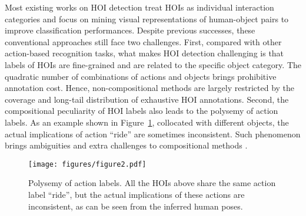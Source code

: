 \documentclass[sigconf,screen]{acmart}
\begin{document}
Most existing works on HOI detection \cite{gkioxari2018detecting,shen2018scaling,gao2018ican,li2019transferable,wang2019deep,wan2019pose,gupta2019no} treat HOIs as individual interaction categories and focus on mining visual representations of human-object pairs to improve classification performances. Despite previous successes, these conventional approaches still face two challenges. First, compared with other action-based recognition tasks, what makes HOI detection challenging is that labels of HOIs are fine-grained and are related to the specific object category. The quadratic number of combinations of actions and objects brings prohibitive annotation cost. Hence, non-compositional methods \cite{chao2018learning,gao2018ican,li2019transferable,qi2018learning,wang2019deep,wan2019pose} are largely restricted by the coverage and long-tail distribution of exhaustive HOI annotations. Second, the compositional peculiarity of HOI labels also leads to the polysemy of action labels. As an example shown in Figure~\ref{fig2}, collocated with different objects, the actual implications of action ``ride'' are sometimes inconsistent. Such phenomenon brings ambiguities and extra challenges to compositional methods \cite{gkioxari2018detecting,shen2018scaling,gupta2019no,bansal2019detecting}.

\begin{figure}
\centering
\texttt{[image: figures/figure2.pdf]}
\caption{Polysemy of action labels. All the HOIs above share the same action label ``ride'', but the actual implications of these actions are inconsistent, as can be seen from the inferred human poses.}
\label{fig2}
\end{figure}
\end{document}
